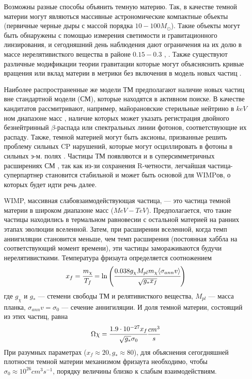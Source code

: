 Возможны разные способы объянить темную материю. Так, в качестве темной материи могут являються массивные астрономические компактные объекты (первичные черные дыры с массой порядка $10-100M_{\odot}$). Такие объекты могут быть обнаружены с помощью измерения светимости и гравитационного линзирования, и сегодняшний день наблюдения дают ограничения на их долю в массе нерелятивисткого вещества в районе $0.15-0.3$ \cite{Zumalac_rregui_2018}, \cite{Blaineau_2022}.
Также существуют различные модификации теории гравитации которые могут объясняснить кривые вращения или вклад материи в метрики без включения в модель новых частиц \cite{1984ApJ...286....7B}.


Наиболее распространенные же модели ТМ предполагают наличие новых частиц вне 
стандартной модели (СМ), которые находятся в активном поиске. В качестве кандитатов рассмитривают, например, майорановские стерильные нейтрино в $keV$ном диапазоне масс \cite{Boyarsky_2019}, наличие которых может указать регистрация двойного безнейтринный $\beta$-распада или спектральных линии фотонов, соответствующие их распаду. Также, темной материей могут быть аксионы, призванные решить проблему сильных CP нарушений, которые могут осциллировать в фотоны в сильных э-м. полях \cite{adams2023axion}. Частицы ТМ появляются и в суперсимметричных расширениях СМ \cite{berezinsky1996dark}, так как из-зи сохранения R-четности, легчайшая частица-суперпартнер становится стабильной и может быть основой для WIMPов, о которых будет идти речь далее.

WIMP, массивная слабовзаимодействующая частица, --- это частица темной материи в широком диапазоне масс ($MeV-TeV$). Предполагается, что такие частицы находились в термальном равновесии с остальной материей на ранних этапах эволюции вселенной. Затем, при расширении вселенной, когда темп аниигиляции становится меньше, чем темп расширения (постоянная хаббла на соответствующий момент времени), эти частицы замораживаются будучи нерелятивисткими\cite{Kolb:1990vq}. Температура фризаута определяется соотножением 
\begin{equation}
	x_f = \cfrac{m_{\chi} }{T_f} = \ln {\left(\cfrac{0.038 g_{\chi} M_{pl} m_{\chi}  \langle \sigma_{ann} v \rangle}
		{\sqrt{g_* x_f}}\right)}
\end{equation}
где $g_{\chi}$ и $g_*$ --- стемени свободы ТМ и релятивисткого вещества, $M_{pl}$ --- масса планка, $\sigma_{ann} v = \sigma_0$ --- сечение аннигиляции. И доля темной материи, состоящий из этих частиц, равна 
\begin{equation}
	\Omega{\chi} = \cfrac{{1.9}\cdot 10^{-27} x_f}{\sqrt{g_*} \sigma_0} \frac{cm^3}{s}
\end{equation}
При разумных параметрах ($x_f \approx 20, g_* \approx 80$), для объяснения сегогдняшней плотности темной материи механизмом фризаута необходимо, чтобы $\sigma_0 \approx 10^{26} cm^3s^{-1}$, порядку величины близко к слабым взаимодействиям.

